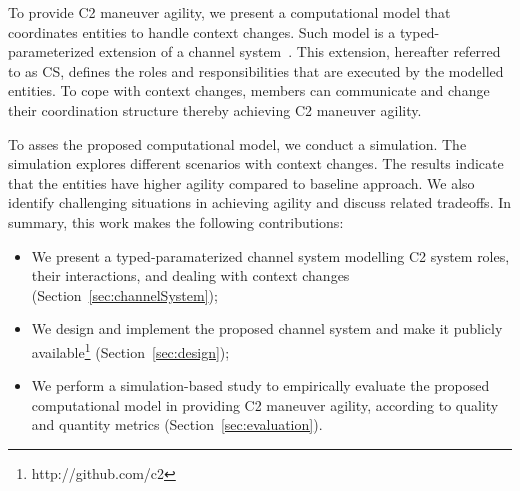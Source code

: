 
To provide C2 maneuver agility, we present a computational model that coordinates entities to handle context changes. Such model is a typed-parameterized extension of a channel system~\citep{modelcheckingBaier}. This extension, hereafter referred to as CS, defines the roles and responsibilities that are executed by the modelled entities. To cope with context changes, members can communicate and change their coordination structure thereby achieving C2 maneuver agility.


To asses the proposed computational model, we conduct a simulation. The simulation explores different scenarios with context changes. The results indicate that the entities have higher agility compared to baseline approach. We also identify challenging situations in achieving agility and discuss related tradeoffs. In summary, this work makes the following contributions:

\begin{itemize}
    \item We present a typed-paramaterized channel system modelling C2 system roles, their interactions, and dealing with context changes (Section~\ref{sec:channelSystem});
    \item We design and implement the proposed channel system and make it  publicly available\footnote{http://github.com/c2} (Section~\ref{sec:design});
    \item We perform a simulation-based study to empirically evaluate the proposed computational model in providing C2 maneuver agility, according to quality and quantity metrics (Section~\ref{sec:evaluation}). 
\end{itemize}
